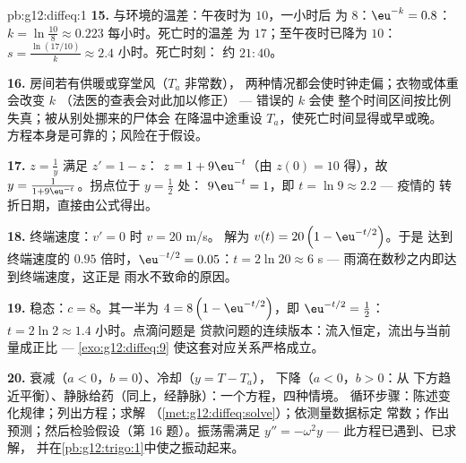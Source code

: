 \begin{solution}{pb:g12:diffeq:1}
\textbf{15.} 与环境的温差：午夜时为 $10$，一小时后
为 $8$：$\eu^{-k} = 0.8$：
$k = \ln\frac{10}{8} \approx 0.223$ 每小时。死亡时的温差
为 $17$；至午夜时已降为 $10$：
$s = \frac{\ln(17/10)}{k} \approx 2.4$ 小时。死亡时刻：
约 $21{:}40$。

\textbf{16.} 房间若有供暖或穿堂风（$T_a$ 非常数），
两种情况都会使时钟走偏；衣物或体重会改变 $k$
（法医的查表会对此加以修正） --- 错误的 $k$ 会使
整个时间区间按比例失真；被从别处挪来的尸体会
在降温中途重设 $T_a$，使死亡时间显得或早或晚。
方程本身是可靠的；风险在于假设。

\textbf{17.} $z = \frac1y$ 满足 $z' = 1 - z$：
$z = 1 + 9\eu^{-t}$（由 $z(0) = 10$ 得），故
$y = \frac{1}{1 + 9\eu^{-t}}$。拐点位于 $y = \frac12$ 处：
$9\eu^{-t} = 1$，即 $t = \ln 9 \approx 2.2$ --- 疫情的
转折日期，直接由公式得出。

\textbf{18.} 终端速度：$v' = 0$ 时 $v = 20$ m/s。
解为 $v(t) = 20\left(1 - \eu^{-t/2}\right)$。于是
达到终端速度的 $0.95$ 倍时，$\eu^{-t/2} = 0.05$：$t = 2\ln 20 \approx 6$ s ---
雨滴在数秒之内即达到终端速度，这正是
雨水不致命的原因。

\textbf{19.} 稳态：$c = 8$。其一半为
$4 = 8\left(1 - \eu^{-t/2}\right)$，即 $\eu^{-t/2} = \frac12$：
$t = 2\ln 2 \approx 1.4$ 小时。点滴问题是
贷款问题的连续版本：流入恒定，流出与当前量成正比 ---
\cref{exo:g12:diffeq:9} 使这套对应关系严格成立。

\textbf{20.} 衰减（$a < 0$，$b = 0$）、冷却（$y = T - T_a$），
下降（$a < 0$，$b > 0$：从
下方趋近平衡）、静脉给药（同上，经静脉）：一个方程，四种情境。
循环步骤：陈述变化规律；列出方程；求解
（\cref{met:g12:diffeq:solve}）；依测量数据标定
常数；作出预测；然后检验假设（第
16 题）。振荡需满足 $y'' = -\omega^2 y$ --- 此方程已遇到、已求解，
并在\cref{pb:g12:trigo:1}中使之振动起来。
\end{solution}
